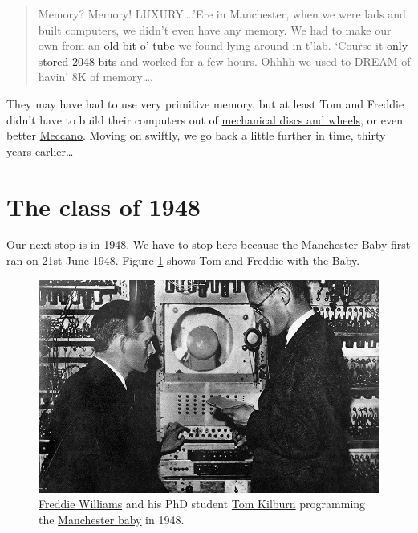\documentclass[
  12pt,
]{book}
\begin{document}
\begin{quote}
Memory? Memory! LUXURY\ldots.'Ere in Manchester, when we were lads and built computers, we didn't even
have any memory. We had to make our own from an \href{https://en.wikipedia.org/wiki/Williams_tube}{old bit o' tube} we found lying around in t'lab.
`Course it \href{http://curation.cs.manchester.ac.uk/computer50/www.computer50.org/mark1/ip-mm1.crt2048.html}{only stored 2048 bits} and worked for a few hours. Ohhhh we used to DREAM of havin' 8K of
memory\ldots.
\end{quote}

They may have had to use very primitive memory, but at least Tom and Freddie didn't have to build their computers out of \href{https://www.sciencemuseum.org.uk/objects-and-stories/lovelace-turing-and-invention-computers}{mechanical discs and wheels}, or even better \href{https://en.wikipedia.org/wiki/Differential_analyser\#Use_of_Meccano}{Meccano}. \citep{meccano, hartree} Moving on swiftly, we go back a little further in time, thirty years earlier\ldots{}

\hypertarget{y1948}{%
\section{The class of 1948}\label{y1948}}

Our next stop is in 1948. We have to stop here because the \href{https://en.wikipedia.org/wiki/Manchester_Baby}{Manchester Baby} first ran on 21st June 1948. Figure \ref{fig:tomfred-fig} shows Tom and Freddie with the Baby. \citep{lavington}

\begin{figure}

{\centering \includegraphics[width=0.99\linewidth]{images/kilburn_williams_manchester_baby} 

}

\caption{\href{https://en.wikipedia.org/wiki/Frederic_Calland_Williams}{Freddie Williams} and his PhD student \href{https://en.wikipedia.org/wiki/Tom_Kilburn}{Tom Kilburn} programming the \href{https://en.wikipedia.org/wiki/Manchester_Baby}{Manchester baby} in 1948.}\label{fig:tomfred-fig}
\end{figure}
\end{document}
